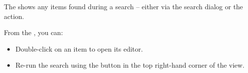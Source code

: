 The \gdsearchresultview{} shows any items found during a search -- either via the search dialog or the  action.

From the \gdsearchresultview{}, you can:

\begin{itemize}
\item Double-click on an item to open its editor. 
\item Re-run the search using the button in the top right-hand corner of the view. 
\end{itemize}
